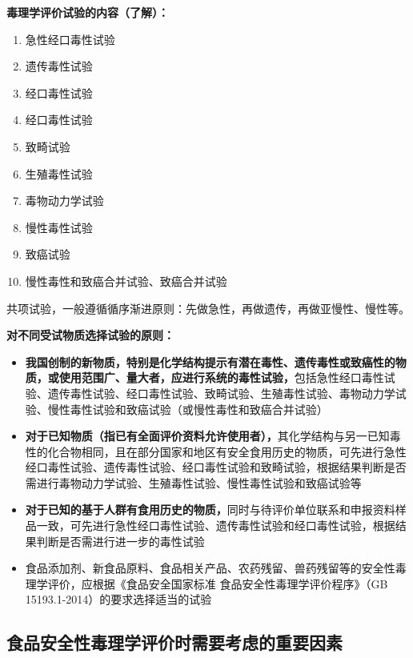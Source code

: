 \begin{defbox}
\textbf{毒理学评价试验的内容（了解）：}
\begin{enumerate}[leftmargin=*]
    \item 急性经口毒性试验
    \item 遗传毒性试验
    \item {}经口毒性试验
    \item {}经口毒性试验
    \item 致畸试验
    \item 生殖毒性试验
    \item 毒物动力学试验
    \item 慢性毒性试验
    \item 致癌试验
    \item 慢性毒性和致癌合并试验、致癌合并试验
\end{enumerate}
共项试验，一般遵循循序渐进原则：先做急性，再做遗传，再做亚慢性、慢性等。

\textbf{对不同受试物质选择试验的原则：}
\begin{itemize}[leftmargin=*]
    \item \textbf{我国创制的新物质，特别是化学结构提示有潜在毒性、遗传毒性或致癌性的物质，或使用范围广、量大者，应进行系统的毒性试验，}包括急性经口毒性试验、遗传毒性试验、经口毒性试验、致畸试验、生殖毒性试验、毒物动力学试验、慢性毒性试验和致癌试验（或慢性毒性和致癌合并试验）
    \item \textbf{对于已知物质（指已有全面评价资料允许使用者），}其化学结构与另一已知毒性的化合物相同，且在部分国家和地区有安全食用历史的物质，可先进行急性经口毒性试验、遗传毒性试验、经口毒性试验和致畸试验，根据结果判断是否需进行毒物动力学试验、生殖毒性试验、慢性毒性试验和致癌试验等
    \item \textbf{对于已知的基于人群有食用历史的物质，}同时与待评价单位联系和申报资料样品一致，可先进行急性经口毒性试验、遗传毒性试验和经口毒性试验，根据结果判断是否需进行进一步的毒性试验
    \item 食品添加剂、新食品原料、食品相关产品、农药残留、兽药残留等的安全性毒理学评价，应根据《食品安全国家标准 食品安全性毒理学评价程序》（GB 15193.1-2014）的要求选择适当的试验
\end{itemize}
\end{defbox}

\subsection{食品安全性毒理学评价时需要考虑的重要因素}

